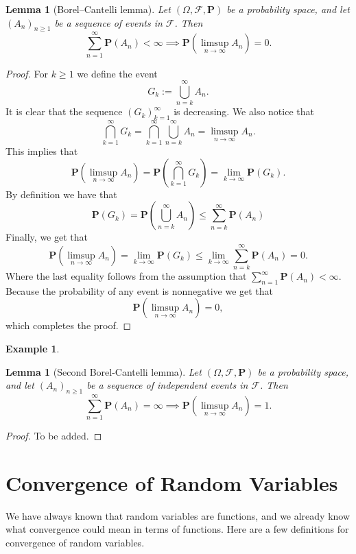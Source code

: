 \documentclass[11pt,a4paper]{article}
\theoremstyle{definition}
\newtheorem{example}{Example}[section]
\theoremstyle{plain}
\newtheorem{lemma}[theorem]{Lemma}
\newcommand{\Prob}{\mathbf{P}}
\begin{document}
  \begin{lemma}[Borel--Cantelli lemma]
    Let $(\Omega, \mathcal F, \Prob)$ be a probability space, and let 
    $(A_n)_{n \geq 1}$ be a sequence of events in $\mathcal F$. Then
    \[
      \sum_{n=1}^{\infty} \Prob(A_n) < \infty \implies
      \Prob(\limsup_{n \to \infty} A_n) = 0.
    \]
  \end{lemma}
  \begin{proof}
    For $k \geq 1$ we define the event
    \[
      G_k := \bigcup_{n=k}^{\infty} A_n.
    \]
    It is clear that the sequence $(G_k)_{k=1}^{\infty}$ is decreasing.
    We also notice that
    \[
      \bigcap_{k=1}^{\infty} G_k =
      \bigcap_{k=1}^{\infty} \bigcup_{n=k}^{\infty} A_n =
      \limsup_{n \to \infty} A_n.
    \]
    This implies that
    \[
      \Prob\left(\limsup_{n \to \infty} A_n\right) =
      \Prob\left(\bigcap_{k=1}^{\infty} G_k\right) =
      \lim_{k \to \infty} \Prob(G_k).
    \]
    By definition we have that
    \[
      \Prob(G_k) =
      \Prob\left(\bigcup_{n=k}^{\infty} A_n\right) \le
      \sum_{n=k}^{\infty} \Prob(A_n)
    \]
    Finally, we get that
    \[
      \Prob\left(\limsup_{n \to \infty} A_n\right) =
      \lim_{k \to \infty} \Prob(G_k) \le
      \lim_{k \to \infty} \sum_{n=k}^{\infty} \Prob(A_n) =
      0.
    \]
    Where the last equality follows from the assumption that
    $\sum_{n=1}^{\infty} \Prob(A_n) < \infty$.
    Because the probability of any event is nonnegative we get that
    \[
      \Prob\left(\limsup_{n \to \infty} A_n\right) = 0,
    \]
    which completes the proof.
  \end{proof}

  \begin{example}
    
  \end{example}

  \begin{lemma}[Second Borel-Cantelli lemma]
    Let $(\Omega, \mathcal F, \Prob)$ be a probability space, and let
    $(A_n)_{n \geq 1}$ be a sequence of independent events in $\mathcal F$.
    Then
    \[
      \sum_{n=1}^{\infty} \Prob(A_n) = \infty \implies
      \Prob\left(\limsup_{n \to \infty} A_n\right) = 1.
    \]
  \end{lemma}
  
  \begin{proof}
    To be added.
  \end{proof}

  \newpage
  
  \section{Convergence of Random Variables}
  We have always known that random variables are functions,
  and we already know what convergence could mean in terms of functions.
  Here are a few definitions for convergence of random variables.
\end{document}
